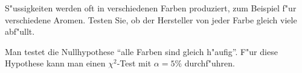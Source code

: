 S"ussigkeiten werden oft in verschiedenen Farben produziert, zum Beispiel
f"ur verschiedene Aromen. Testen Sie, ob der Hersteller von jeder Farbe
gleich viele abf"ullt.

\begin{loesung}
Man testet die Nullhypothese ``alle Farben sind gleich h"aufig''. F"ur
diese Hypothese kann man einen $\chi^2$-Test mit $\alpha=5\%$ durchf"uhren.
\end{loesung}


